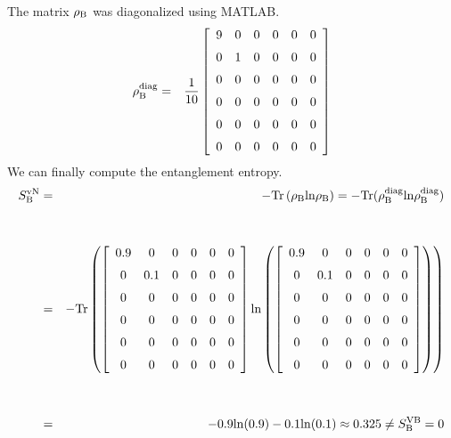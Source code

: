 The matrix $\rho_{\rm B}$ was diagonalized using MATLAB.
\begin{eqnarray*}
\rho^{\rm diag}_{\rm B} &=& \frac{1}{10}\left[ \begin {array}{cccccc}
			9&0&0&0&0&0\\
			\noalign{\medskip}
			0&1&0&0&0&0 \\ \noalign{\medskip}
			0&0&0&0&0&0 \\ \noalign{\medskip}
			0&0&0&0&0&0 \\ \noalign{\medskip}
			0&0&0&0&0&0 \\ \noalign{\medskip}
			0&0&0&0&0&0
			\end {array}
			\right] 
			\end{eqnarray*}
We can finally compute the entanglement entropy.
\begin{eqnarray*}
 S^{\rm vN}_{ \rm B} &=& - \rm {\rm Tr}\left(\rho_B{\rm ln} \rho_B\right) =   - {\rm Tr}(\rho^{diag}_B{\rm ln} \rho^{diag}_B) \\ \\ \\
		&=& - {\rm Tr}\left(\left[ \begin {array}{cccccc}
			0.9&0&0&0&0&0\\
			\noalign{\medskip}
			0&0.1&0&0&0&0 \\ \noalign{\medskip}
			0&0&0&0&0&0 \\ \noalign{\medskip}
			0&0&0&0&0&0 \\ \noalign{\medskip}
			0&0&0&0&0&0 \\ \noalign{\medskip}
			0&0&0&0&0&0
			\end {array}
			\right] 
			{\rm ln}\left(\left[ \begin {array}{cccccc}
			0.9&0&0&0&0&0\\
			\noalign{\medskip}
			0&0.1&0&0&0&0 \\ \noalign{\medskip}
			0&0&0&0&0&0 \\ \noalign{\medskip}
			0&0&0&0&0&0 \\ \noalign{\medskip}
			0&0&0&0&0&0 \\ \noalign{\medskip}
			0&0&0&0&0&0
			\end {array}
			\right] \right)\right) \\ \\ \\
		&=& -0.9{\rm ln}(0.9) - 0.1{\rm ln}(0.1) \approx 0.325 \neq S^{\rm VB}_{\rm B} = 0
\end{eqnarray*}


